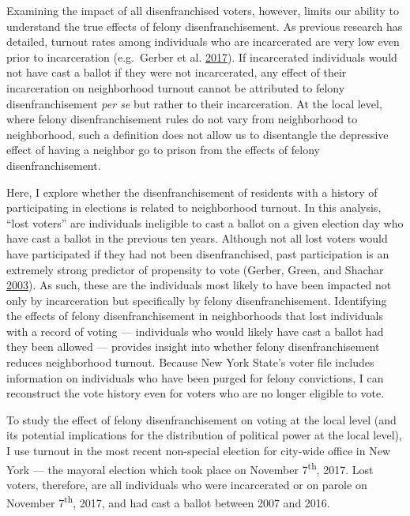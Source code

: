\documentclass[12pt,]{article}
\begin{document}
Examining the impact of all disenfranchised voters, however, limits our ability to understand the true effects of felony disenfranchisement. As previous research has detailed, turnout rates among individuals who are incarcerated are very low even prior to incarceration (e.g.~Gerber et al. \protect\hyperlink{ref-Gerber2017}{2017}). If incarcerated individuals would not have cast a ballot if they were not incarcerated, any effect of their incarceration on neighborhood turnout cannot be attributed to felony disenfranchisement \emph{per se} but rather to their incarceration. At the local level, where felony disenfranchisement rules do not vary from neighborhood to neighborhood, such a definition does not allow us to disentangle the depressive effect of having a neighbor go to prison from the effects of felony disenfranchisement.

Here, I explore whether the disenfranchisement of residents with a history of participating in elections is related to neighborhood turnout. In this analysis, ``lost voters'' are individuals ineligible to cast a ballot on a given election day who have cast a ballot in the previous ten years. Although not all lost voters would have participated if they had not been disenfranchised, past participation is an extremely strong predictor of propensity to vote (Gerber, Green, and Shachar \protect\hyperlink{ref-Gerber2003}{2003}). As such, these are the individuals most likely to have been impacted not only by incarceration but specifically by felony disenfranchisement. Identifying the effects of felony disenfranchisement in neighborhoods that lost individuals with a record of voting --- individuals who would likely have cast a ballot had they been allowed --- provides insight into whether felony disenfranchisement reduces neighborhood turnout. Because New York State's voter file includes information on individuals who have been purged for felony convictions, I can reconstruct the vote history even for voters who are no longer eligible to vote.

To study the effect of felony disenfranchisement on voting at the local level (and its potential implications for the distribution of political power at the local level), I use turnout in the most recent non-special election for city-wide office in New York --- the mayoral election which took place on November 7\textsuperscript{th}, 2017. Lost voters, therefore, are all individuals who were incarcerated or on parole on November 7\textsuperscript{th}, 2017, and had cast a ballot between 2007 and 2016.
\end{document}
